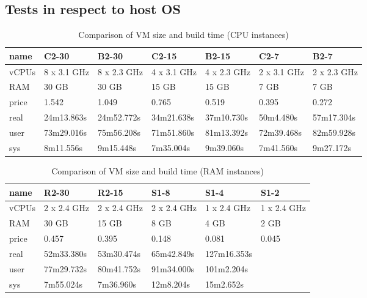 \documentclass[printmode]{mgr}
\begin{document}
\begin{landscape}

\section{Tests in respect to host OS}

\begin{table}
  \begin{tabular}{| p{2.5cm} | p{3cm} | p{3cm} | p{3cm} | p{3cm} | p{3cm} | p{3cm} |}
    \hline
    name & C2-30 & B2-30 & C2-15 & B2-15 & C2-7 & B2-7 \\
    \hline
    vCPUs & 8 x 3.1 GHz & 8 x 2.3 GHz & 4 x 3.1 GHz & 4 x 2.3 GHz & 2 x 3.1 GHz & 2 x 2.3 GHz \\
    \hline
    RAM & 30 GB & 30 GB & 15 GB & 15 GB & 7 GB & 7 GB \\
    \hline
    price & 1.542 & 1.049 & 0.765 & 0.519 & 0.395 & 0.272 \\
    \hline
    real & 24m13.863s & 24m52.772s & 34m21.638s & 37m10.730s & 50m4.480s & 57m17.304s \\
    \hline
    user & 73m29.016s & 75m56.208s & 71m51.860s & 81m13.392s & 72m39.468s & 82m59.928s \\
    \hline
    sys & 8m11.556s & 9m15.448s & 7m35.004s & 9m39.060s & 7m41.560s & 9m27.172s \\
    \hline
  \end{tabular}
  \caption{Comparison of VM size and build time (CPU instances)}
\end{table}



\begin{table}
  \begin{tabular}{| p{2.5cm} | p{3cm} | p{3cm} | p{3cm} | p{3cm} | p{3cm} |}
    \hline
    name & R2-30 & R2-15 & S1-8 & S1-4 & S1-2 \\
    \hline
    vCPUs & 2 x 2.4 GHz & 2 x 2.4 GHz & 2 x 2.4 GHz & 1 x 2.4 GHz & 1 x 2.4 GHz \\
    \hline
    RAM & 30 GB & 15 GB & 8 GB & 4 GB & 2 GB \\
    \hline
    price & 0.457 & 0.395 & 0.148 & 0.081 & 0.045 \\
    \hline
    real & 52m33.380s & 53m30.474s & 65m42.849s & 127m16.353s &  \\
    \hline
    user & 77m29.732s & 80m41.752s & 91m34.000s & 101m2.204s &  \\
    \hline
    sys & 7m55.024s & 7m36.960s & 12m8.204s & 15m2.652s &  \\
    \hline
  \end{tabular}
  \caption{Comparison of VM size and build time (RAM instances)}
\end{table}


\end{landscape}
\end{document}
